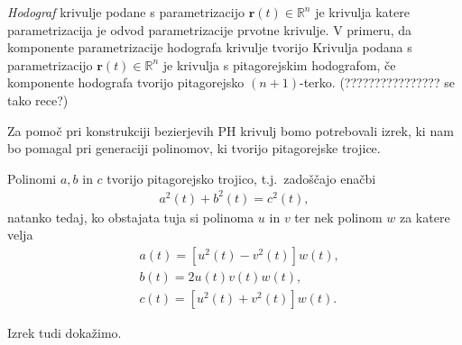 \documentclass[isrm2, tisk]{fmfdelo}
\newcommand{\R}{\mathbb R}
\begin{document}
    \textit{Hodograf} krivulje podane s parametrizacijo $\mathbf{r}(t)\in \R^n$ je krivulja katere parametrizacija je odvod parametrizacije prvotne krivulje.
    V primeru, da komponente parametrizacije hodografa krivulje tvorijo
    Krivulja podana s parametrizacijo $\mathbf{r}(t)\in \R^n$ je krivulja s pitagorejskim hodografom, če komponente hodografa tvorijo pitagorejsko $(n+1)$-terko. (???????????????? se tako rece?)

    Za pomoč pri konstrukciji bezierjevih PH krivulj bomo potrebovali izrek, ki nam bo pomagal pri generaciji polinomov, ki tvorijo pitagorejske trojice.

    \begin{izrek}              %
        Polinomi $a,b$ in $c$ tvorijo pitagorejsko trojico, t.j.\ zadoščajo enačbi
        \vspace{-0.3cm}
        \begin{align}
            a^2(t)+b^2(t)=c^2(t), \label{eq:abc}
        \end{align}
        natanko tedaj, ko obstajata tuja si polinoma $u$ in $v$ ter nek polinom  $w$ za katere velja
        \vspace{-0.3cm}
        \begin{align}
            &a(t)=[u^2(t)-v^2(t)]w(t), \nonumber \\
            &b(t)=2u(t)v(t)w(t),        \nonumber \\
            &c(t)=[u^2(t)+v^2(t)]w(t). \label{eq:uvw}
        \end{align}
    \end{izrek}

    Izrek tudi dokažimo.
\end{document}
